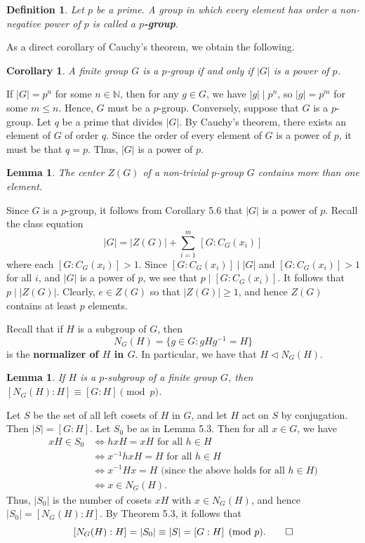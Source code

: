 \documentclass[10pt]{article}
\makeatletter
\newcommand{\N}{\mathbb{N}}
\newcommand{\norm}{\triangleleft}
\theoremstyle{newstyle}
\newtheorem{cor}[thm]{Corollary}
\newtheorem{lemma}[thm]{Lemma}
\newtheorem{defn}[thm]{Definition}
\newenvironment{pf}[1][\proofname]{\par
  \pushQED{\qed}%
  \normalfont \topsep0\p@\relax
  \trivlist
  \item[\hskip\labelsep\scshape
  #1\@addpunct{.}]\ignorespaces
}{%
  \popQED\endtrivlist\@endpefalse
}
\makeatother
\begin{document}
\begin{defn}
Let $p$ be a prime. A group in which every element has order a non-negative power of $p$ 
is called a {\bf $p$-group}. 
\end{defn}

As a direct corollary of Cauchy's theorem, we obtain the following. 

\begin{cor}
A finite group $G$ is a $p$-group if and only if $|G|$ is a power of $p$.
\end{cor}
\begin{pf}
If $|G| = p^n$ for some $n \in \N$, then for any $g \in G$, we have $|g| \mid p^n$, so 
$|g| = p^m$ for some $m \leq n$. Hence, $G$ must be a $p$-group. 
Conversely, suppose that $G$ is a $p$-group. Let $q$ be a prime that divides $|G|$. 
By Cauchy's theorem, there exists an element of $G$ of order $q$. Since the order of every 
element of $G$ is a power of $p$, it must be that $q = p$. Thus, $|G|$ is a power of $p$.
\end{pf}

\begin{lemma}
The center $Z(G)$ of a non-trivial $p$-group $G$ contains more than one element. 
\end{lemma}
\begin{pf}
Since $G$ is a $p$-group, it follows from Corollary 5.6 that $|G|$ is a power of $p$. 
Recall the class equation 
\[ |G| = |Z(G)| + \sum_{i=1}^m\,[G : C_G(x_i)] \]
where each $[G : C_G(x_i)] > 1$. Since $[G : C_G(x_i)] \mid |G|$ and 
$[G : C_G(x_i)] > 1$ for all $i$, and $|G|$ is a power of $p$, we see that $p \mid [G : C_G(x_i)]$. 
It follows that $p \mid |Z(G)|$. Clearly, $e \in Z(G)$ so that $|Z(G)| \geq 1$, and hence 
$Z(G)$ contains at least $p$ elements. 
\end{pf}

Recall that if $H$ is a subgroup of $G$, then 
\[ N_G(H) = \{g \in G : gHg^{-1} = H\} \]
is the {\bf normalizer of $H$ in $G$}. In particular, we have that $H \norm N_G(H)$. 

\begin{lemma}
If $H$ is a $p$-subgroup of a finite group $G$, then $[N_G(H) : H] \equiv [G : H] \pmod p$. 
\end{lemma}
\begin{pf}
Let $S$ be the set of all left cosets of $H$ in $G$, and let $H$ act on $S$ by conjugation. 
Then $|S| = [G : H]$. Let $S_0$ be as in Lemma 5.3. Then for all $x \in G$, we have 
\begin{align*}
    xH \in S_0 &\iff hxH = xH \text{ for all } h \in H \\
    &\iff x^{-1}hxH = H \text{ for all } h \in H \\
    &\iff x^{-1}Hx = H \text{ (since the above holds for all $h \in H$)} \\
    &\iff x \in N_G(H).
\end{align*}
Thus, $|S_0|$ is the number of cosets $xH$ with $x \in N_G(H)$, and hence $|S_0| = [N_G(H) : H]$. 
By Theorem 5.3, it follows that 
\[ [N_G(H) : H] = |S_0| \equiv |S| = [G : H] \pmod p. \qedhere \]
\end{pf}
\end{document}
